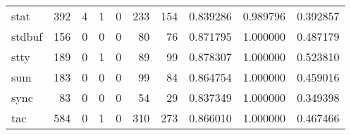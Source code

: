\begin{longtable}{lrrrrrrrrr}
stat      &                                   392 &                                                  4 &                                                  1 &                                                  0 &                                                233 &                                                154 &                                           0.839286 &                               0.989796 &                             0.392857 \\
stdbuf    &                                   156 &                                                  0 &                                                  0 &                                                  0 &                                                 80 &                                                 76 &                                           0.871795 &                               1.000000 &                             0.487179 \\
stty      &                                   189 &                                                  0 &                                                  1 &                                                  0 &                                                 89 &                                                 99 &                                           0.878307 &                               1.000000 &                             0.523810 \\
sum       &                                   183 &                                                  0 &                                                  0 &                                                  0 &                                                 99 &                                                 84 &                                           0.864754 &                               1.000000 &                             0.459016 \\
sync      &                                    83 &                                                  0 &                                                  0 &                                                  0 &                                                 54 &                                                 29 &                                           0.837349 &                               1.000000 &                             0.349398 \\
tac       &                                   584 &                                                  0 &                                                  1 &                                                  0 &                                                310 &                                                273 &                                           0.866010 &                               1.000000 &                             0.467466 \\

\end{longtable}
